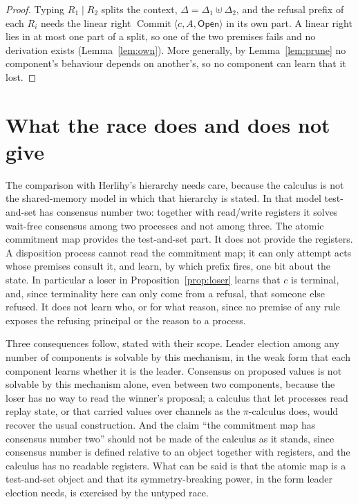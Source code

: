 \documentclass[11pt,openany]{book}
\theoremstyle{remark}
\newcommand{\Commit}{\operatorname{Commit}}
\begin{document}
\begin{proof}
Typing $R_1\mid R_2$ splits the context, $\Delta=\Delta_1\uplus\Delta_2$,
and the refusal prefix of each $R_i$ needs the linear right
$\Commit\langle c,A,\mathsf{Open}\rangle$ in its own part. A linear right
lies in at most one part of a split, so one of the two premises fails and
no derivation exists (Lemma~\ref{lem:own}). More generally, by
Lemma~\ref{lem:prune} no component's behaviour depends on another's, so no
component can learn that it lost.
\end{proof}

\section{What the race does and does not give}

The comparison with Herlihy's hierarchy needs care, because the
calculus is not the shared-memory model in which that hierarchy is
stated. In that model test-and-set has consensus number two: together
with read/write registers it solves wait-free consensus among two
processes and not among three. The atomic commitment map provides the
test-and-set part. It does not provide the registers. A disposition
process cannot read the commitment map; it can only attempt acts whose
premises consult it, and learn, by which prefix fires, one bit about the
state. In particular a loser in Proposition~\ref{prop:loser} learns that
$c$ is terminal, and, since terminality here can only come from a
refusal, that someone else refused. It does not learn who, or for what
reason, since no premise of any rule exposes the refusing principal or
the reason to a process.

Three consequences follow, stated with their scope. Leader election among
any number of components is solvable by this mechanism, in the weak form
that each component learns whether it is the leader. Consensus on
proposed values is not solvable by this mechanism alone, even between two
components, because the loser has no way to read the winner's proposal;
a calculus that let processes read replay state, or that carried values
over channels as the $\pi$-calculus does, would recover the usual
construction. And the claim ``the commitment map has consensus number
two'' should not be made of the calculus as it stands, since consensus
number is defined relative to an object together with registers, and the
calculus has no readable registers. What can be said is that the
atomic map is a test-and-set object and that its symmetry-breaking power,
in the form leader election needs, is exercised by the untyped race.
\end{document}
